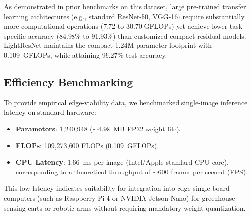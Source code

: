 \documentclass[conference]{IEEEtran}
\begin{document}
\begin{table}[htbp]
\caption{Comparison with Published Baselines on the Figshare Tomato Dataset~\cite{shahi2025deep}}
\label{tab:comparison}
\centering
{}
\end{table}

As demonstrated in prior benchmarks on this dataset, large pre-trained transfer learning architectures (e.g., standard ResNet-50, VGG-16) require substantially more computational operations (7.72 to 30.70 GFLOPs) yet achieve lower task-specific accuracy (84.98\% to 91.93\%) than customized compact residual models. LightResNet maintains the compact 1.24M parameter footprint with 0.109~GFLOPs, while attaining 99.27\% test accuracy.

\subsection{Efficiency Benchmarking}
To provide empirical edge-viability data, we benchmarked single-image inference latency on standard hardware:
\begin{itemize}
    \item \textbf{Parameters}: 1,240,948 ($\sim$4.98~MB FP32 weight file).
    \item \textbf{FLOPs}: 109,273,600 FLOPs (0.109~GFLOPs).
    \item \textbf{CPU Latency}: 1.66~ms per image (Intel/Apple standard CPU core), corresponding to a theoretical throughput of $\sim$600 frames per second (FPS).
\end{itemize}
This low latency indicates suitability for integration into edge single-board computers (such as Raspberry Pi 4 or NVIDIA Jetson Nano) for greenhouse sensing carts or robotic arms without requiring mandatory weight quantization.
\end{document}
